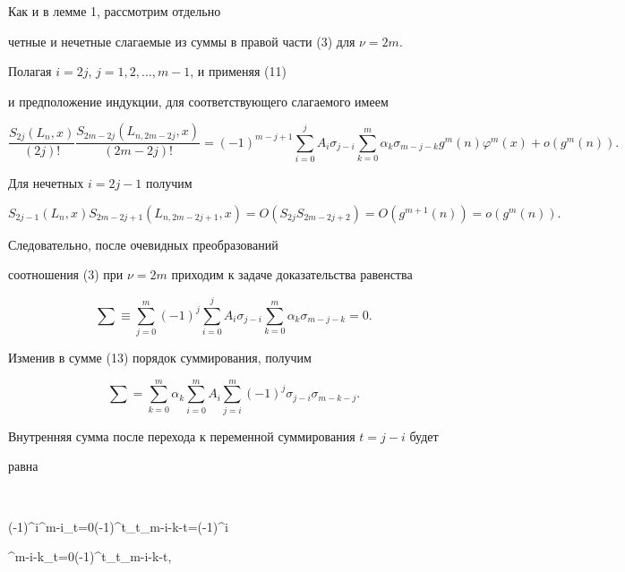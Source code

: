 Как и в лемме 1, рассмотрим отдельно 


четные и нечетные слагаемые из суммы в правой части (3) для $\nu=2m$. 


Полагая $i=2j$, $j=1,2,\dotsc,m-1$, и применяя (11) 


и предположение индукции, для соответствующего слагаемого имеем 


$$


\frac{S_{2j}(L_n,x)}{(2j)!} 


\frac{S_{2m-2j}(L_{n,2m-2j},x)}{(2m-2j)!}= 


% 


(-1)^{m-j+1}\sum^j_{i=0}A_i\sigma_{j-i} 


\sum^m_{k=0}\alpha_k\sigma_{m-j-k} 


g^m(n)\varphi^m(x)+o(g^m(n)). 


$$


Для нечетных $i=2j-1$ получим 


$$ 


S_{2j-1}(L_n,x)S_{2m-2j+1}(L_{n,2m-2j+1},x)= 


O(S_{2j}S_{2m-2j+2})=O(g^{m+1}(n))=o(g^m(n)). 


$$ 


Следовательно, после очевидных преобразований 


соотношения (3) при $\nu=2m$ приходим к задаче доказательства равенства 


\begin{equation} 


\sum\equiv\sum^m_{j=0}(-1)^j\sum^j_{i=0}A_i\sigma_{j-i} 


\sum^m_{k=0}\alpha_k\sigma_{m-j-k}=0. 


\end{equation} 


Изменив в сумме (13) порядок суммирования, получим 


$$ 


\sum=\sum^m_{k=0}\alpha_k\sum^m_{i=0}A_i\sum^m_{j=i} 


(-1)^j\sigma_{j-i}\sigma_{m-k-j}. 


$$ 


Внутренняя сумма после перехода к переменной суммирования $t=j-i$ будет 


равна 


$$ 


(-1)^i\sum^{m-i}_{t=0}(-1)^t\sigma_t\sigma_{m-i-k-t}=(-1)^i 


\sum^{m-i-k}_{t=0}(-1)^t\sigma_t\sigma_{m-i-k-t}, 


